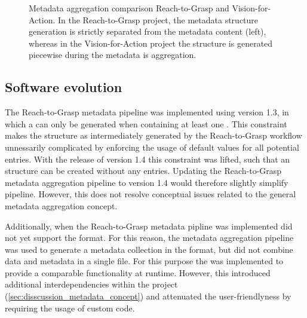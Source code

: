 \begin{figure}
 \centering
 
 \caption[Metadata aggregation comparison Reach-to-Grasp and Vision-for-Action]{Metadata aggregation comparison Reach-to-Grasp and Vision-for-Action. In the Reach-to-Grasp project, the metadata structure generation is strictly separated from the metadata content (left), whereas in the Vision-for-Action project the structure is generated  piecewise during the metadata is aggregation.}
 \label{fig:discussion_comparison_r2g_v4a}
\end{figure}

\subsection{Software evolution}
The Reach-to-Grasp metadata pipeline was implemented using  version 1.3, in which a   can only be generated when containing at least one . This constraint makes the  structure as intermediately generated by the Reach-to-Grasp workflow unnessarily complicated by enforcing the usage of default values for all potential  entries. With the release of  version 1.4 this constraint was lifted, such that an  structure can be created without any  entries. Updating the Reach-to-Grasp metadata aggregation pipeline to  version 1.4 would therefore slightly simplify pipeline. However, this does not resolve conceptual issues related to the general metadata aggregation concept.

Additionally, when the Reach-to-Grasp metadata pipline was implemented  did not yet support the  format. For this reason, the metadata aggregation pipeline was used to generate a metadata collection in the  format, but did not combine data and metadata in a single file. For this purpose the  was implemented to provide a comparable functionality at runtime. However, this introduced additional interdependencies within the project (\cref{sec:disscussion_metadata_concept}) and attenuated the user-friendlyness by requiring the usage of custom code.


